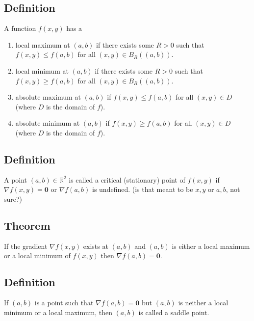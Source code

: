 \documentclass[11pt]{article}
\newcommand{\reals}{\mathbb{R}}
\renewcommand{\vec}[1]{\mathbf{#1}}
\begin{document}
\subsection{Definition}
A function $f(x,y)$ has a
\begin{enumerate}[ (i) ]
\item local maximum at $(a, b)$ if there exists some $R > 0$ such that $f(x, y) \leq f(a, b)$ for all $(x, y) \in B_R ((a, b))$.
\item local minimum at $(a, b)$ if there exists some $R > 0$ such that $f(x, y) \geq f(a, b)$ for all $(x, y) \in B_R ((a, b))$.
\item absolute maximum at $(a ,b)$ if $f(x,y) \leq f(a, b)
$ for all $(x, y) \in D$ (where $D$ is the domain of $f$).
\item absolute minimum at $(a ,b)$ if $f(x,y) \geq f(a, b)$ for all $(x, y) \in D$ (where $D$ is the domain of $f$).
\end{enumerate}

\subsection{Definition}
A point $(a, b) \in \reals^2$ is called a critical (stationary) point of $f(x, y)$ if $\nabla f(x, y) = \vec{0}$ or $\nabla f(a, b)$ is undefined. (is that meant to be $x, y$ or $a, b$, not sure?)

\subsection{Theorem}
If the gradient $\nabla f(x, y)$ exists at $(a, b)$ and $(a, b)$ is either a local maximum or a local minimum of $f(x,y)$ then $\nabla f(a,b) = \vec{0}$.

\subsection{Definition}
If $(a, b)$ is a point such that $\nabla f(a, b) = \vec{0}$ but $(a, b)$ is neither a local minimum or a local maximum, then $(a, b)$ is called a saddle point.
\end{document}
